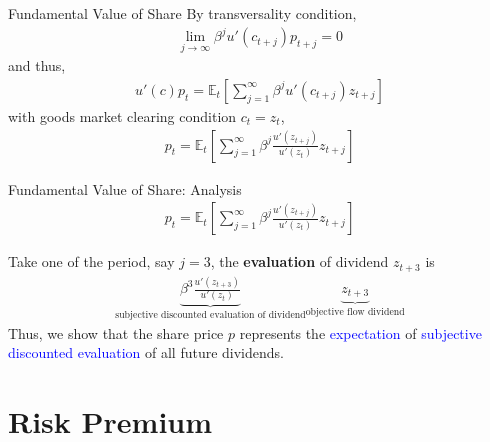 \documentclass[handout, 11pt,aspectratio=43,usenames,dvipsnames]{beamer}
\newcommand{\blue}[1]{\textcolor{blue}{#1}}
\theoremstyle{definition}
\begin{document}
\begin{frame}{Fundamental Value of Share}
\label{slide:Fundamental_Value_of_Share}
    By transversality condition,
    \begin{align}
        \lim_{j\rightarrow \infty} \beta^{j} u'(c_{t+j}) p_{t+j} = 0
    \end{align}
    and thus,
    \begin{align}
        u'(c) p_{t} = \mathbb{E}_{t}\left[
            \sum_{j=1}^{\infty} \beta^{j} u'(c_{t+j}) z_{t+j}
        \right]
    \end{align}
    with goods market clearing condition $ c_{t} = z_{t} $,
    \begin{align}
        p_{t} = \mathbb{E}_{t}\left[
            \sum_{j=1}^{\infty} \beta^{j} \frac{u'(z_{t+j})}{u'(z_{t})} z_{t+j}
        \right]
    \end{align}

\end{frame}

\begin{frame}{Fundamental Value of Share: Analysis}
\label{slide:Fundamental_Value_of_Share__Analysis}
    \begin{align}
        p_{t} = \mathbb{E}_{t}\left[
            \sum_{j=1}^{\infty} \beta^{j} \frac{u'(z_{t+j})}{u'(z_{t})} z_{t+j}
        \right]
    \end{align}

    Take one of the period, say $ j = 3 $, the \textbf{evaluation} of dividend $ z_{t+3} $ is
    \begin{align}
        \underbrace{\beta^{3} \frac{u'(z_{t+3})}{u'(z_{t})}}_{\text{subjective discounted evaluation of dividend}} \underbrace{z_{t+3}}_{\text{objective flow dividend}}
    \end{align}
    Thus, we show that the share price $ p $ represents the \blue{expectation} of \blue{subjective discounted evaluation} of all future dividends.
\end{frame}

\section{Risk Premium}
\label{sec:Risk_Premium}
\end{document}
